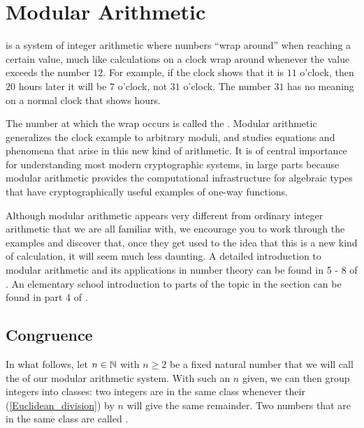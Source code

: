 \section{Modular Arithmetic}
\label{modular_arithmetic}
 is a system of integer arithmetic where numbers ``wrap around'' when reaching a certain value, much like calculations on a clock wrap around whenever the value exceeds the number $12$. For example, if the clock shows that it is $11$ o'clock, then $20$ hours later it will be $7$ o'clock, not $31$ o'clock. The number $31$ has no meaning on a normal clock that shows hours.

The number at which the wrap occurs is called the . Modular arithmetic generalizes the clock example to arbitrary moduli, and studies equations and phenomena that arise in this new kind of arithmetic. It is of central importance for understanding most modern cryptographic systems, in large parts because modular arithmetic provides the computational infrastructure for algebraic types that have cryptographically useful examples of one-way functions.\

Although modular arithmetic appears very different from ordinary integer arithmetic that we are all familiar with, we encourage you to work through the examples and discover that, once they get used to the idea that this is a new kind of calculation, it will seem much less daunting. A detailed introduction to modular arithmetic and its applications in number theory can be found in \chaptname{} 5 - 8 of \cite{hardy-2008}. An elementary school introduction to parts of the topic in the section can be found in part 4 of \cite{wu-1}.

\subsection{Congruence}
In what follows, let $n\in\mathbb{N}$ with $n\geq 2$ be a fixed natural number that we will call the  of our modular arithmetic system. With such an $n$ given, we can then group integers into classes: two integers are in the same class whenever their  (\ref{Euclidean_division}) by $n$ will give the same remainder. Two numbers that are in the same class are called .

